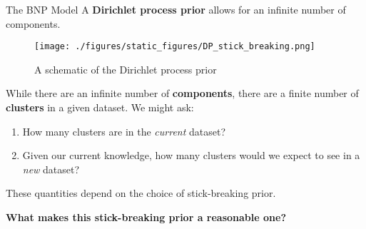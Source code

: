 \begin{frame}{The BNP Model}
A {\bf Dirichlet process prior} allows for an infinite number of components.
\vspace{-0.2in}
\begin{figure}[!h]
\centering
\texttt{[image: ./figures/static\_figures/DP\_stick\_breaking.png]}
\caption{A schematic of the Dirichlet process prior}
\end{figure}
\vspace{-0.2in}

While there are an infinite number of {\bf components}, there are a finite number of {\bf clusters} in a given dataset. \pause We might ask:

\begin{enumerate}[(1)]
\item How many clusters are in the {\itshape current} dataset?

\pause
\item Given our current knowledge, how many clusters would we expect to see in a {\itshape new} dataset?

\end{enumerate}

\pause

These quantities depend on the choice of stick-breaking prior.

\pause

\begin{mdframed}[style=MyFrame]
\begin{center}
{\bf What makes this stick-breaking prior a reasonable one?}
\end{center}
\end{mdframed}

\end{frame}
